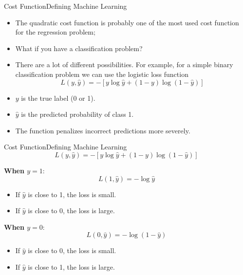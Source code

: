 \documentclass[11pt]{beamer}
\begin{document}
\begin{frame}{Cost Function}{Defining Machine Learning}
\begin{itemize}
\item The quadratic cost function is probably one of the most used cost function for the regression problem;
\item What if you have a classification problem?
\item There are a lot of different possibilities. For example, for a simple binary classification problem we can use the logistic loss function
\begin{equation}\label{logistic_loss_function}
L(y, \hat{y}) = -[y\log{\hat{y}} + (1 - y)\log{(1 - \hat{y})}]
\end{equation}
\end{itemize}
    \begin{itemize}
        \item $y$ is the true label (0 or 1).
        \item $\hat{y}$ is the predicted probability of class 1.
        \item The function penalizes incorrect predictions more severely.
    \end{itemize}

\end{frame}
\begin{frame}{Cost Function}{Defining Machine Learning}
\begin{equation}\label{logistic_loss_function}
L(y, \hat{y}) = -[y\log{\hat{y}} + (1 - y)\log{(1 - \hat{y})}]
\end{equation}

    \textbf{When \( y = 1 \)}:
    \[ L(1, \hat{y}) = -\log{\hat{y}} \]
    \begin{itemize}
        \item If \( \hat{y} \) is close to 1, the loss is small.
        \item If \( \hat{y} \) is close to 0, the loss is large.
    \end{itemize}
    \vspace{0.25cm}
    \textbf{When \( y = 0 \)}:
    \[ L(0, \hat{y}) = -\log{(1 - \hat{y})} \]
    \begin{itemize}
        \item If \( \hat{y} \) is close to 0, the loss is small.
        \item If \( \hat{y} \) is close to 1, the loss is large.
    \end{itemize}
\end{frame}
\end{document}
